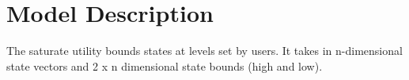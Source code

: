 \section{Model Description}

The saturate utility bounds states at levels set by users. It takes in n-dimensional state vectors and 2 x n dimensional state bounds (high and low).
